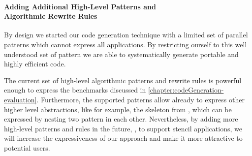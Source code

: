 \paragraph{Adding Additional High-Level Patterns and\\ Algorithmic Rewrite Rules}
By design we started our code generation technique with a limited set of parallel patterns which cannot express all applications.
By restricting ourself to this well understood set of pattern we are able to systematically generate portable and highly efficient code.

The current set of high-level algorithmic patterns and rewrite rules is powerful enough to express the benchmarks discussed in \autoref{chapter:codeGeneration-evaluation}.
Furthermore, the supported patterns allow already to express other higher level abstractions, like for example, the \allpairs skeleton from \SkelCL, which can be expressed by nesting two \map pattern in each other.
Nevertheless, by adding more high-level patterns and rules in the future, \eg, to support stencil applications, we will increase the expressiveness of our approach and make it more attractive to potential users.

